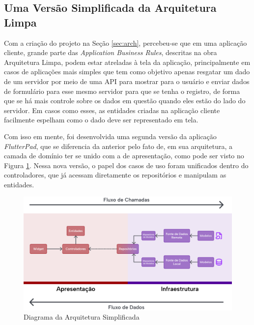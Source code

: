 \documentclass[12pt, %
openright, 
oneside, %
a4paper,    %
brazil]{facom-ufu-abntex2}
\begin{document}
\subsection{Uma Versão Simplificada da Arquitetura Limpa} \label{subsec:simplified_arch}

Com a criação do projeto na Seção \ref{sec:arch}, percebeu-se que em uma aplicação cliente, grande parte das \textit{Application Business Rules}, descritas na obra Arquitetura Limpa, podem estar atreladas à tela da aplicação, principalmente em casos de aplicações mais simples que tem como objetivo apenas resgatar um dado de um servidor por meio de uma API para mostrar para o usuário e enviar dados de formulário para esse mesmo servidor para que se tenha o registro, de forma que se há mais controle sobre os dados em questão quando eles estão do lado do servidor. Em casos como esses, as entidades criadas na aplicação cliente facilmente espelham como o dado deve ser representado em tela.

Com isso em mente, foi desenvolvida uma segunda versão da aplicação \textit{FlutterPad}, que se diferencia da anterior pelo fato de, em sua arquitetura, a camada de domínio ter se unido com a de apresentação, como pode ser visto no Figura \ref{fig:arch_simplified_diagram}. Nessa nova versão, o papel dos casos de uso foram unificados dentro do controladores, que já acessam diretamente os repositórios e manipulam as entidades.

\begin{figure}[ht]
    \centering
    \includegraphics[width=1\textwidth]{figures/arch/arch_simplified_diagram.png}
    \caption{Diagrama da Arquitetura Simplificada}
    \label{fig:arch_simplified_diagram}
\end{figure}
\end{document}
